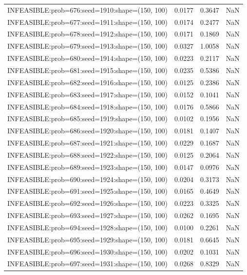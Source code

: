 \begin{longtable}{lccc}
INFEASIBLE:prob=676:seed=1910:shape=(150, 100) &   0.0177 &  0.3647 &    NaN \\
INFEASIBLE:prob=677:seed=1911:shape=(150, 100) &   0.0174 &  0.2477 &    NaN \\
INFEASIBLE:prob=678:seed=1912:shape=(150, 100) &   0.0171 &  0.1869 &    NaN \\
INFEASIBLE:prob=679:seed=1913:shape=(150, 100) &   0.0327 &  1.0058 &    NaN \\
INFEASIBLE:prob=680:seed=1914:shape=(150, 100) &   0.0223 &  0.2117 &    NaN \\
INFEASIBLE:prob=681:seed=1915:shape=(150, 100) &   0.0235 &  0.5386 &    NaN \\
INFEASIBLE:prob=682:seed=1916:shape=(150, 100) &   0.0125 &  0.2386 &    NaN \\
INFEASIBLE:prob=683:seed=1917:shape=(150, 100) &   0.0152 &  0.1041 &    NaN \\
INFEASIBLE:prob=684:seed=1918:shape=(150, 100) &   0.0176 &  0.5866 &    NaN \\
INFEASIBLE:prob=685:seed=1919:shape=(150, 100) &   0.0102 &  0.1956 &    NaN \\
INFEASIBLE:prob=686:seed=1920:shape=(150, 100) &   0.0181 &  0.1407 &    NaN \\
INFEASIBLE:prob=687:seed=1921:shape=(150, 100) &   0.0229 &  0.1687 &    NaN \\
INFEASIBLE:prob=688:seed=1922:shape=(150, 100) &   0.0125 &  0.2064 &    NaN \\
INFEASIBLE:prob=689:seed=1923:shape=(150, 100) &   0.0147 &  0.0976 &    NaN \\
INFEASIBLE:prob=690:seed=1924:shape=(150, 100) &   0.0204 &  0.3173 &    NaN \\
INFEASIBLE:prob=691:seed=1925:shape=(150, 100) &   0.0165 &  0.4649 &    NaN \\
INFEASIBLE:prob=692:seed=1926:shape=(150, 100) &   0.0223 &  0.3325 &    NaN \\
INFEASIBLE:prob=693:seed=1927:shape=(150, 100) &   0.0262 &  0.1695 &    NaN \\
INFEASIBLE:prob=694:seed=1928:shape=(150, 100) &   0.0100 &  0.2261 &    NaN \\
INFEASIBLE:prob=695:seed=1929:shape=(150, 100) &   0.0181 &  0.6645 &    NaN \\
INFEASIBLE:prob=696:seed=1930:shape=(150, 100) &   0.0202 &  0.1031 &    NaN \\
INFEASIBLE:prob=697:seed=1931:shape=(150, 100) &   0.0268 &  0.8329 &    NaN \\

\end{longtable}
